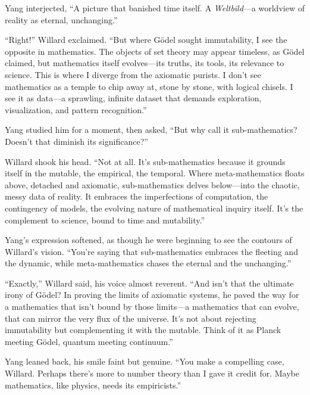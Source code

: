 Yang interjected, “A picture that banished time itself. A \textit{Weltbild}—a worldview of reality as eternal, unchanging.”

“Right!” Willard exclaimed. “But where Gödel sought immutability, I see the opposite in mathematics. The objects of set theory may appear timeless, as Gödel claimed, but mathematics itself evolves—its truths, its tools, its relevance to science. This is where I diverge from the axiomatic purists. I don’t see mathematics as a temple to chip away at, stone by stone, with logical chisels. I see it as data—a sprawling, infinite dataset that demands exploration, visualization, and pattern recognition.”

Yang studied him for a moment, then asked, “But why call it sub-mathematics? Doesn’t that diminish its significance?”

Willard shook his head. “Not at all. It’s sub-mathematics because it grounds itself in the mutable, the empirical, the temporal. Where meta-mathematics floats above, detached and axiomatic, sub-mathematics delves below—into the chaotic, messy data of reality. It embraces the imperfections of computation, the contingency of models, the evolving nature of mathematical inquiry itself. It’s the complement to science, bound to time and mutability.”

Yang’s expression softened, as though he were beginning to see the contours of Willard’s vision. “You’re saying that sub-mathematics embraces the fleeting and the dynamic, while meta-mathematics chases the eternal and the unchanging.”

“Exactly,” Willard said, his voice almost reverent. “And isn’t that the ultimate irony of Gödel? In proving the limits of axiomatic systems, he paved the way for a mathematics that isn’t bound by those limits—a mathematics that can evolve, that can mirror the very flux of the universe. It’s not about rejecting immutability but complementing it with the mutable. Think of it as Planck meeting Gödel, quantum meeting continuum.”

Yang leaned back, his smile faint but genuine. “You make a compelling case, Willard. Perhaps there’s more to number theory than I gave it credit for. Maybe mathematics, like physics, needs its empiricists.”



